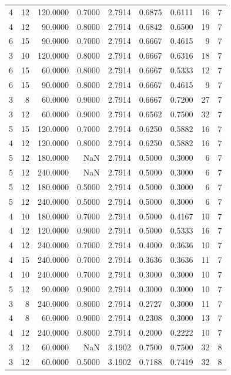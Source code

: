 \begin{tabular}{rrrrrrrrr}
4 & 12 & 120.0000 & 0.7000 & 2.7914 & 0.6875 & 0.6111 & 16 & 7 \\
4 & 12 & 90.0000 & 0.8000 & 2.7914 & 0.6842 & 0.6500 & 19 & 7 \\
6 & 15 & 90.0000 & 0.7000 & 2.7914 & 0.6667 & 0.4615 & 9 & 7 \\
3 & 10 & 120.0000 & 0.8000 & 2.7914 & 0.6667 & 0.6316 & 18 & 7 \\
6 & 15 & 60.0000 & 0.8000 & 2.7914 & 0.6667 & 0.5333 & 12 & 7 \\
6 & 15 & 90.0000 & 0.8000 & 2.7914 & 0.6667 & 0.4615 & 9 & 7 \\
3 & 8 & 60.0000 & 0.9000 & 2.7914 & 0.6667 & 0.7200 & 27 & 7 \\
3 & 12 & 60.0000 & 0.9000 & 2.7914 & 0.6562 & 0.7500 & 32 & 7 \\
5 & 15 & 120.0000 & 0.7000 & 2.7914 & 0.6250 & 0.5882 & 16 & 7 \\
4 & 12 & 120.0000 & 0.8000 & 2.7914 & 0.6250 & 0.5882 & 16 & 7 \\
5 & 12 & 180.0000 & NaN & 2.7914 & 0.5000 & 0.3000 & 6 & 7 \\
5 & 12 & 240.0000 & NaN & 2.7914 & 0.5000 & 0.3000 & 6 & 7 \\
5 & 12 & 180.0000 & 0.5000 & 2.7914 & 0.5000 & 0.3000 & 6 & 7 \\
5 & 12 & 240.0000 & 0.5000 & 2.7914 & 0.5000 & 0.3000 & 6 & 7 \\
4 & 10 & 180.0000 & 0.7000 & 2.7914 & 0.5000 & 0.4167 & 10 & 7 \\
4 & 12 & 120.0000 & 0.9000 & 2.7914 & 0.5000 & 0.5333 & 16 & 7 \\
4 & 12 & 240.0000 & 0.7000 & 2.7914 & 0.4000 & 0.3636 & 10 & 7 \\
4 & 15 & 240.0000 & 0.7000 & 2.7914 & 0.3636 & 0.3636 & 11 & 7 \\
4 & 10 & 240.0000 & 0.7000 & 2.7914 & 0.3000 & 0.3000 & 10 & 7 \\
5 & 12 & 90.0000 & 0.9000 & 2.7914 & 0.3000 & 0.3000 & 10 & 7 \\
3 & 8 & 240.0000 & 0.8000 & 2.7914 & 0.2727 & 0.3000 & 11 & 7 \\
4 & 8 & 60.0000 & 0.9000 & 2.7914 & 0.2308 & 0.3000 & 13 & 7 \\
4 & 12 & 240.0000 & 0.8000 & 2.7914 & 0.2000 & 0.2222 & 10 & 7 \\
3 & 12 & 60.0000 & NaN & 3.1902 & 0.7500 & 0.7500 & 32 & 8 \\
3 & 12 & 60.0000 & 0.5000 & 3.1902 & 0.7188 & 0.7419 & 32 & 8 \\

\end{tabular}
